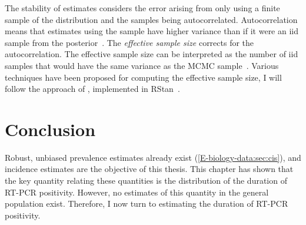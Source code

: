 \documentclass[thesis.tex]{subfiles}
\begin{document}
The stability of estimates considers the error arising from only using a finite sample of the distribution and the samples being autocorrelated.
Autocorrelation means that estimates using the sample have higher variance than if it were an iid sample from the posterior~\autocite[286]{gelmanBDA}.
The \emph{effective sample size} corrects for the autocorrelation.
The effective sample size can be interpreted as the number of iid samples that would have the same variance as the MCMC sample~\autocites[286]{gelmanBDA}{vehtariRhat}.
Various techniques have been proposed for computing the effective sample size, I will follow the approach of \textcite{vehtariRhat}, implemented in RStan~\autocite{RStan-2-32-3}.

\section{Conclusion} \label{inc-prev:sec:conclusion}

Robust, unbiased prevalence estimates already exist (\cref{E-biology-data:sec:cis}), and incidence estimates are the objective of this thesis.
This chapter has shown that the key quantity relating these quantities is the distribution of the duration of RT-PCR positivity.
However, no estimates of this quantity in the general population exist.
Therefore, I now turn to estimating the duration of RT-PCR positivity.

\ifSubfilesClassLoaded{
  \listoftodos
}{}
\end{document}
